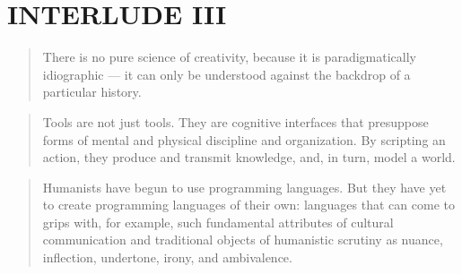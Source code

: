 
\pagestyle{empty}

\chapter*{INTERLUDE III}
\label{interlude3}



\begin{quotation}
  There is no pure science of creativity, because it is paradigmatically idiographic --- it can only be understood against the backdrop of a particular history.
\end{quotation}

\begin{quotation}
  Tools are not just tools. They are cognitive interfaces that presuppose forms of mental and physical discipline and organization. By scripting an action, they produce and transmit knowledge, and, in turn, model a world. 
\end{quotation}

\begin{quotation}
  Humanists have begun to use programming languages. But they have yet to create programming languages of their own: languages that can come to grips with, for example, such fundamental attributes of cultural communication and traditional objects of humanistic scrutiny as nuance, inflection, undertone, irony, and ambivalence. 
\end{quotation}

\pagestyle{fania}


\clearpage